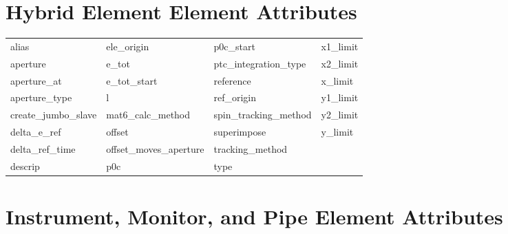  \section{Hybrid Element Element Attributes}
 \label{s:list.hybrid}
 
 \begin{tabular}{llll} \toprule
alias                       & ele_origin                  & p0c_start                   & x1_limit                    \\
aperture                    & e_tot                       & ptc_integration_type        & x2_limit                    \\
aperture_at                 & e_tot_start                 & reference                   & x_limit                     \\
aperture_type               & l                           & ref_origin                  & y1_limit                    \\
create_jumbo_slave          & mat6_calc_method            & spin_tracking_method        & y2_limit                    \\
delta_e_ref                 & offset                      & superimpose                 & y_limit                     \\
delta_ref_time              & offset_moves_aperture       & tracking_method             &                             \\
descrip                     & p0c                         & type                        &                             \\
 \bottomrule
 \end{tabular}
 \vfill
 
 \section{Instrument, Monitor, and Pipe Element Attributes}
 \label{s:list.instrument}
 
